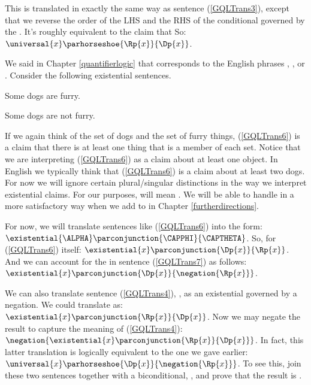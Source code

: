 \noindent{}This is translated in exactly the same way as sentence (\ref{GQLTrans3}), except that we reverse the order of the LHS and the RHS of the conditional governed by the \mention{$\forall$}.  It's roughly equivalent to the claim that   So: $\universal{\variable{x}}\parhorseshoe{\Rp{\variable{x}}}{\Dp{\variable{x}}}$.

We said in Chapter \ref{quantifierlogic} that \mention{$\exists$} corresponds to the English phrases , , or .  Consider the following existential sentences.

\begin{menumerate}
	\item\label{GQLTrans6} Some dogs are furry.
	\item\label{GQLTrans7} Some dogs are not furry.
\end{menumerate}

\noindent{}If we again think of the set of dogs and the set of furry things, (\ref{GQLTrans6}) is a claim that there is at least one thing that is a member of each set.  Notice that we are interpreting (\ref{GQLTrans6}) as a claim about at least one object.  In English we typically think that (\ref{GQLTrans6}) is a claim about at least two dogs.  For now we will ignore certain plural/singular distinctions in the way we interpret existential claims.  For our purposes,  will mean .  We will be able to handle  in a more satisfactory way when we add to \GQL{} in Chapter \ref{furtherdirections}.

For now, we will translate sentences like (\ref{GQLTrans6}) into the form: $\existential{\ALPHA}\parconjunction{\CAPPHI}{\CAPTHETA}$.  So, for (\ref{GQLTrans6}) itself: $\existential{\variable{x}}\parconjunction{\Dp{\variable{x}}}{\Rp{\variable{x}}}$.  And we can account for the  in sentence (\ref{GQLTrans7}) as follows: $\existential{\variable{x}}\parconjunction{\Dp{\variable{x}}}{\negation{\Rp{\variable{x}}}}$.

We can also translate sentence (\ref{GQLTrans4}), , as an existential governed by a negation.  We could translate  as: $\existential{\variable{x}}\parconjunction{\Rp{\variable{x}}}{\Dp{\variable{x}}}$.  Now we may negate the result to capture the meaning of (\ref{GQLTrans4}): $\negation{\existential{\variable{x}}\parconjunction{\Rp{\variable{x}}}{\Dp{\variable{x}}}}$.  In fact, this latter translation is logically equivalent to the one we gave earlier: $\universal{\variable{x}}\parhorseshoe{\Dp{\variable{x}}}{\negation{\Rp{\variable{x}}}}$.  To see this, join these two sentences together with a biconditional, \mention{$\TRIPLEBAR$}, and prove that the result is .

